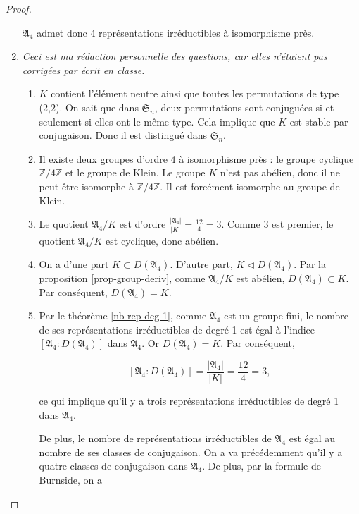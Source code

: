 \documentclass[french]{book}
\theoremstyle{definition}
\theoremstyle{remark}
\begin{document}
\begin{proof}
\begin{enumerate}
    \(\mathfrak{A}_4\) admet donc 4 représentations irréductibles à isomorphisme près.

    \item \emph{Ceci est ma rédaction personnelle des questions, car elles n'étaient pas corrigées par écrit en classe.}

    \begin{enumerate}
      \item \(K\) contient l'élément neutre ainsi que toutes les permutations de type (2,2). On sait que dans \(\mathfrak{S}_n\), deux permutations sont conjuguées si et seulement si elles ont le même type. Cela implique que \(K\) est stable par conjugaison. Donc il est distingué dans \(\mathfrak{S}_n\).
      \item Il existe deux groupes d'ordre 4 à isomorphisme près : le groupe cyclique \(\mathbb{Z}/{4}\mathbb{Z}\) et le groupe de Klein. Le groupe \(K\) n'est pas abélien, donc il ne peut être isomorphe à \(\mathbb{Z}/{4}\mathbb{Z}\). Il est forcément isomorphe au groupe de Klein.
      \item Le quotient \(\mathfrak{A}_4 / K\) est d'ordre \(\frac{\left\lvert \mathfrak{A}_4 \right\rvert}{\left\lvert K \right\rvert} = \frac{12}{4}=3\). Comme 3 est premier, le quotient \(\mathfrak{A}_4 / K\) est cyclique, donc abélien.
      \item On a d'une part \(K \subset D(\mathfrak{A}_4)\). D'autre part, \(K \triangleleft D(\mathfrak{A}_4)\). Par la proposition \ref{prop-group-deriv}, comme \(\mathfrak{A}_4 / K\) est abélien, \(D(\mathfrak{A}_4) \subset K\). Par conséquent, \(D(\mathfrak{A}_4) = K\).
      \item Par le théorème \ref{nb-rep-deg-1}, comme \(\mathfrak{A}_4\) est un groupe fini, le nombre de ses représentations irréductibles de degré 1 est égal à l'indice \([\mathfrak{A}_4 : D(\mathfrak{A}_4)]\) dans \(\mathfrak{A}_4\). Or \(D(\mathfrak{A}_4) = K\). Par conséquent,

      \[[\mathfrak{A}_4 : D(\mathfrak{A}_4)] = \frac{\left\lvert \mathfrak{A}_4 \right\rvert}{\left\lvert K \right\rvert} = \frac{12}{4} = 3,\]

      ce qui implique qu'il y a trois représentations irréductibles de degré 1 dans \(\mathfrak{A}_4\).

      De plus, le nombre de représentations irréductibles de \(\mathfrak{A}_4\) est égal au nombre de ses classes de conjugaison. On a va précédemment qu'il y a quatre classes de conjugaison dans \(\mathfrak{A}_4\). De plus, par la formule de Burnside, on a


\end{enumerate}
\end{enumerate}
\end{proof}
\end{document}
